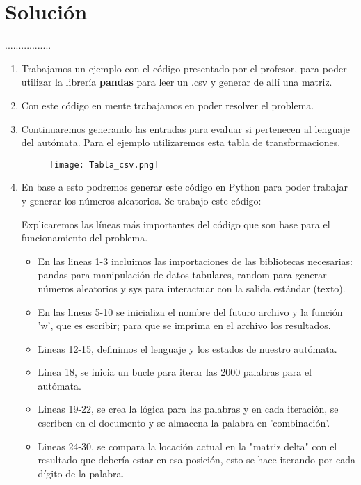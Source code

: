 \documentclass{article}
\begin{document}
		\section {Solución} \label{sec:solución}
		.................
		\begin{enumerate}
		    \item Trabajamos un ejemplo con el código presentado por el profesor, para poder utilizar la librería \textbf{pandas} para leer un .csv y generar de allí una matriz.

        

		    \item Con este código en mente trabajamos en poder resolver el problema.
            \item Continuaremos generando las entradas para evaluar si pertenecen al lenguaje del autómata. Para el ejemplo utilizaremos esta tabla de transformaciones.

                \begin{figure}[h]
                \texttt{[image: Tabla\_csv.png]}
                \end{figure}
                
            \item En base a esto podremos generar este código en Python para poder trabajar y generar los números aleatorios. Se trabajo este código: 

            

            Explicaremos las líneas más importantes del código que son base para el funcionamiento del problema.

            \begin{itemize}
                \item En las lineas 1-3 incluimos las importaciones de las bibliotecas necesarias: pandas para manipulación de datos tabulares, random para generar números aleatorios y sys para interactuar con la salida estándar (texto). 
                \item En las lineas 5-10 se inicializa el nombre del futuro archivo y la función 'w', que es escribir; para que se imprima en el archivo los resultados.
                \item Lineas 12-15, definimos el lenguaje y los estados de nuestro autómata.
                \item Linea 18, se inicia un bucle para iterar las 2000 palabras para el autómata.
                \item Lineas 19-22, se crea la lógica para las palabras y en cada iteración, se escriben en el documento y se almacena la palabra en 'combinación'.
                \item Lineas 24-30, se compara la locación actual en la "matriz delta" con el resultado que debería estar en esa posición, esto se hace iterando por cada dígito de la palabra.
            \end{itemize}


\end{enumerate}
\end{document}
